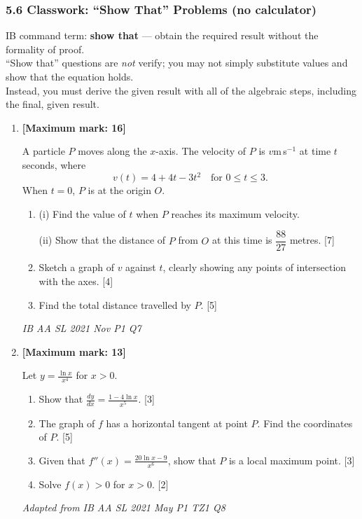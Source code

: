 \documentclass[12pt, twoside]{article}
\begin{document}
\subsubsection*{5.6 Classwork: ``Show That'' Problems (no calculator)}

IB command term: \textbf{show that} --- obtain the required result without the formality of proof.\\[0.25cm] ``Show that'' questions are
\emph{not} verify; you may not simply substitute values and show that the equation holds. \\[0.25cm]
Instead, you must derive the given result with all of the algebraic steps, including the final, given result. \vspace{1cm}

\begin{enumerate}[itemsep=0.2cm]

\item \textbf{[Maximum mark: 16]}

A particle $P$ moves along the $x$-axis. The velocity of $P$ is $v$\;m\,s$^{-1}$
at time $t$ seconds, where
\[v(t) = 4 + 4t - 3t^2 \quad \text{for } 0 \leq t \leq 3.\]
When $t = 0$, $P$ is at the origin $O$.

\begin{enumerate}[itemsep=0.15cm]
  \item (i) \; Find the value of $t$ when $P$ reaches its maximum velocity.

        (ii) Show that the distance of $P$ from $O$ at this time is
             $\dfrac{88}{27}$ metres. \hfill [7]
  \item Sketch a graph of $v$ against $t$, clearly showing any points of
        intersection with the axes. \hfill [4]
  \item Find the total distance travelled by $P$. \hfill [5]
\end{enumerate}

\vfill
\hfill \emph{IB AA SL 2021 Nov P1 Q7}

\item \textbf{[Maximum mark: 13]}

Let $\displaystyle y = \frac{\ln x}{x^4}$ for $x > 0$.

\begin{enumerate}[itemsep=0.15cm]
  \item Show that $\displaystyle \frac{dy}{dx} = \frac{1 - 4\ln x}{x^5}$. \hfill [3]
  \item The graph of $f$ has a horizontal tangent at point $P$.
        Find the coordinates of $P$. \hfill [5]
  \item Given that $\displaystyle f''(x) = \frac{20\ln x - 9}{x^6}$,
        show that $P$ is a local maximum point. \hfill [3]
  \item Solve $f(x) > 0$ for $x > 0$. \hfill [2]
\end{enumerate}

\vfill
\hfill \emph{Adapted from IB AA SL 2021 May P1 TZ1 Q8}


\end{enumerate}
\end{document}
